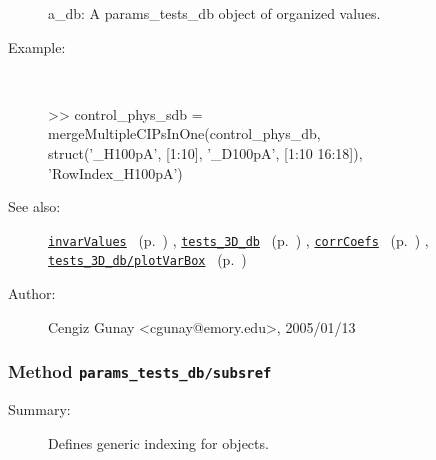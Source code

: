 \begin{description}
	a\_db: A params\_tests\_db object of organized values.
%
\item[Example:]~
\begin{lyxcode}        >> control\_phys\_sdb = \\%
             mergeMultipleCIPsInOne(control\_phys\_db, \\%
                                     struct('\_H100pA', [1:10], '\_D100pA', [1:10 16:18]), \\%
                                     'RowIndex\_H100pA')\\%
\end{lyxcode}
%
\item[See also:]%
\hyperlink{ref_invarValues}{\texttt{invarValues}}%
\ (p.~\pageref{ref_invarValues})%
%
, \hyperlink{ref_tests_3D_db}{\texttt{tests\_3D\_db}}%
\ (p.~\pageref{ref_tests_3D_db})%
%
, \hyperlink{ref_corrCoefs}{\texttt{corrCoefs}}%
\ (p.~\pageref{ref_corrCoefs})%
%
, \hyperlink{ref_tests_3D_db__plotVarBox}{\texttt{tests\_3D\_db/plotVarBox}}%
\ (p.~\pageref{ref_tests_3D_db__plotVarBox})%
%
%
\item[Author:]%
Cengiz Gunay <cgunay@emory.edu>, 2005/01/13%
\end{description}
\methodline%
\subsubsection[Method \texttt{subsref}]{Method \texttt{params\_tests\_db/subsref}}%
%
\label{ref_params_tests_db__subsref}%
\hypertarget{ref_params_tests_db__subsref}{}%
\begin{description}
\item[Summary:]Defines generic indexing for objects.
%
%
%
%
%
%
%
%
\end{description}
\methodline%
